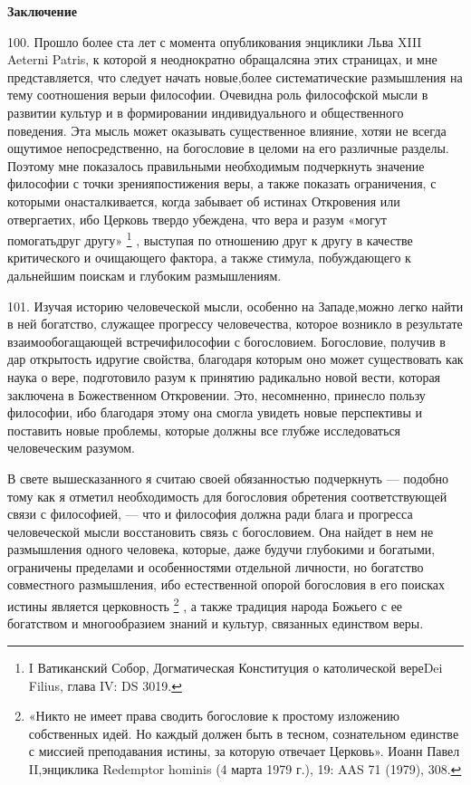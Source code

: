 \documentclass[a5paper,10pt]{article}
\begin{document}
\textbf{Заключение}

100. Прошло более ста лет с момента опубликования энциклики Льва XIII Aeterni
Patris, к которой я неоднократно обращалсяна этих страницах, и мне
представляется, что следует начать новые,более систематические размышления на
тему соотношения верыи философии. Очевидна роль философской мысли в развитии
культур и в формировании индивидуального и общественного поведения. Эта мысль
может оказывать существенное влияние, хотяи не всегда ощутимое непосредственно,
на богословие в целоми на его различные разделы. Поэтому мне показалось
правильными необходимым подчеркнуть значение философии с точки зренияпостижения
веры, а также показать ограничения, с которыми онасталкивается, когда забывает
об истинах Откровения или отвергаетих, ибо Церковь твердо убеждена, что вера и
разум «могут помогатьдруг другу» \footnote{I Ватиканский Собор, Догматическая
Конституция о католической вереDei Filius, глава IV: DS 3019.} , выступая по
отношению друг к другу в качестве критического и очищающего фактора, а также
стимула, побуждающего к дальнейшим поискам и глубоким размышлениям.

101. Изучая историю человеческой мысли, особенно на Западе,можно легко найти в
ней богатство, служащее прогрессу человечества, которое возникло в результате
взаимообогащающей встречифилософии с богословием. Богословие, получив в дар
открытость идругие свойства, благодаря которым оно может существовать как наука
о вере, подготовило разум к принятию радикально новой вести, которая заключена
в Божественном Откровении. Это, несомненно, принесло пользу философии, ибо
благодаря этому она смогла увидеть новые перспективы и поставить новые
проблемы, которые должны все глубже исследоваться человеческим разумом.

В свете вышесказанного я считаю своей обязанностью подчеркнуть — подобно тому
как я отметил необходимость для богословия обретения соответствующей связи с
философией, — что и философия должна ради блага и прогресса человеческой мысли
восстановить связь с богословием. Она найдет в нем не размышления одного
человека, которые, даже будучи глубокими и богатыми, ограничены пределами и
особенностями отдельной личности, но богатство совместного размышления, ибо
естественной опорой богословия в его поисках истины является церковность
\footnote{«Никто не имеет права сводить богословие к простому изложению
собственных идей. Но каждый должен быть в тесном, сознательном единстве с
миссией преподавания истины, за которую отвечает Церковь». Иоанн Павел
II,энциклика Redemptor hominis (4 марта 1979 г.), 19: AAS 71 (1979), 308.} , а
также традиция народа Божьего с ее богатством и многообразием знаний и культур,
связанных единством веры.
\end{document}
